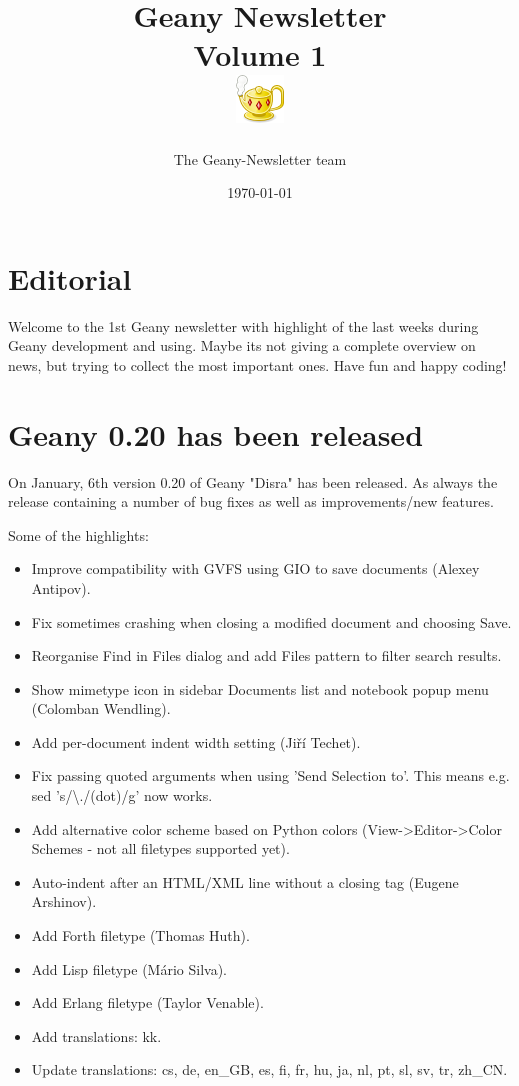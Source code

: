 \documentclass[%
paper=a4,%
fontsize=11pt,%
twoside=false,%
DIV18,
headsepline,
plainheadsepline,
footsepline,
plainfootsepline,
parskip=half,%
openany,%
]{scrartcl}
\title{Geany Newsletter \\[1ex]
	\small{Volume 1} \\[1ex]
	\includegraphics{img/geany.png}}
\author{The Geany-Newsletter team}
\date{\today}
\begin{document}
\maketitle{}
\tableofcontents{}

\section*{Editorial}

Welcome to the 1st Geany newsletter with highlight of the last weeks
during Geany development and using. Maybe its not giving a complete
overview on news, but trying to collect the most important ones.
Have fun and happy coding!

\newpage{}
\section{Geany 0.20 has been released}

On January, 6th version 0.20 of Geany "Disra" has been released. As always
the release containing a number of bug fixes as well as
improvements/new features.

Some of the highlights:

\begin{itemize}
	\item Improve compatibility with GVFS using GIO to save documents (Alexey Antipov).
	\item Fix sometimes crashing when closing a modified document and choosing Save.
	\item Reorganise Find in Files dialog and add Files pattern to filter search results.
	\item Show mimetype icon in sidebar Documents list and notebook popup menu (Colomban Wendling).
	\item Add per-document indent width setting (Jiří Techet).
	\item Fix passing quoted arguments when using 'Send Selection to'. This means e.g. sed 's/\textbackslash{}./(dot)/g' now works.
	\item Add alternative color scheme based on Python colors (View->Editor->Color Schemes - not all filetypes supported yet).
	\item Auto-indent after an HTML/XML line without a closing tag (Eugene Arshinov).
	\item Add Forth filetype (Thomas Huth).
	\item Add Lisp filetype (Mário Silva).
	\item Add Erlang filetype (Taylor Venable).
	\item Add translations: kk.
	\item Update translations: cs, de, en\_GB, es, fi, fr, hu, ja, nl, pt, sl, sv, tr, zh\_CN.
\end{itemize}
\end{document}
